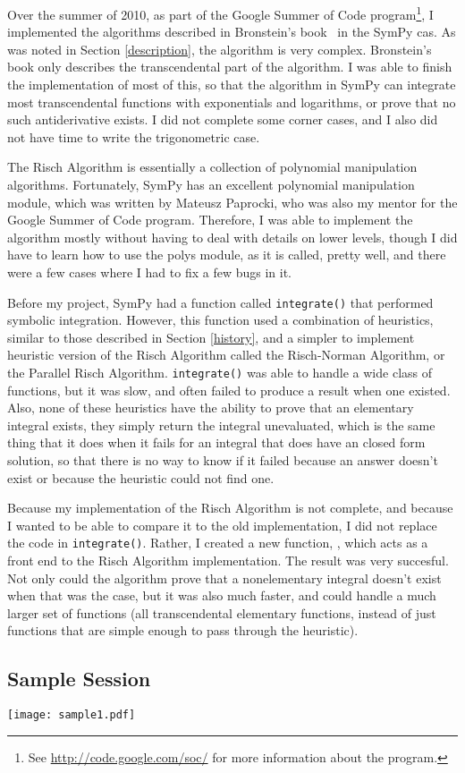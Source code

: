 Over the summer of 2010, as part of the Google Summer of Code
program\footnote{ See \url{http://code.google.com/soc/} for more
information about the program.}, I implemented the algorithms described
in Bronstein's book~\cite{bronstein2005symbolic} in the SymPy \gls{cas}.
As was noted in Section \ref{description}, the algorithm is very
complex. Bronstein's book only describes the \gls{transcendental} part
of the algorithm. I was able to finish the implementation of most of
this, so that the algorithm in SymPy can integrate most
\gls{transcendental} functions with exponentials and logarithms, or
prove that no such antiderivative exists.  I did not complete some
corner cases, and I also did not have time to write the trigonometric
case.

The Risch Algorithm is essentially a collection of polynomial
manipulation algorithms.  Fortunately, SymPy has an excellent polynomial
manipulation module, which was written by Mateusz Paprocki, who was also
my mentor for the Google Summer of Code program.  Therefore, I was able
to implement the algorithm mostly without having to deal with details on
lower levels, though I did have to learn how to use the polys module, as
it is called, pretty well, and there were a few cases where I had to fix
a few bugs in it.

Before my project, SymPy had a function called \texttt{integrate()} that
performed symbolic integration.  However, this function used a
combination of heuristics, similar to those described in Section
\ref{history}, and a simpler to implement heuristic version of the Risch
Algorithm called the Risch-Norman Algorithm, or the Parallel Risch
Algorithm.  \texttt{integrate()} was able to handle a wide class of
functions, but it was slow, and often failed to produce a result when
one existed.  Also, none of these heuristics have the ability to prove
that an \gls{elementary} integral exists, they simply return the
integral unevaluated, which is the same thing that it does when it fails
for an integral that does have an closed form solution, so that there is
no way to know if it failed because an answer doesn't exist or because
the heuristic could not find one.

Because my implementation of the Risch Algorithm is not complete, and
because I wanted to be able to compare it to the old implementation, I
did not replace the code in \texttt{integrate()}.  Rather, I created a
new function, \rischintegrate{}, which acts as a front end to the Risch
Algorithm implementation.  The result was very succesful.  Not only
could the algorithm prove that a nonelementary integral doesn't exist
when that was the case, but it was also much faster, and could handle a
much larger set of functions (all \gls{transcendental} \gls{elementary}
functions, instead of just functions that are simple enough to pass
through the heuristic).

\subsection{Sample Session} 
\label{sample} 
\texttt{[image: sample1.pdf]}